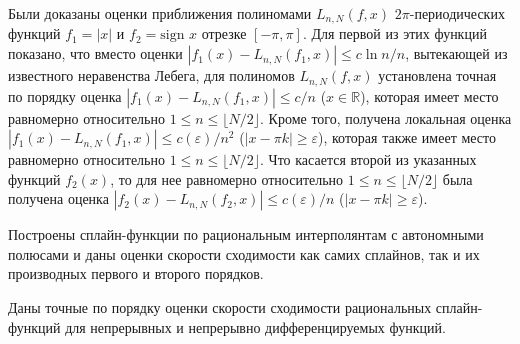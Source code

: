 Были доказаны оценки приближения полиномами $L_{n,N}(f,x)$ $2\pi$-периодических функций $f_1 = |x|$ и $f_2=\mbox{sign } x$ отрезке $[-\pi, \pi]$.
Для первой из этих функций показано, что вместо оценки $\left|f_{1}(x)-L_{n,N}(f_{1},x)\right| \leq c\ln n/n$,
вытекающей из известного неравенства Лебега, для полиномов $L_{n,N}(f,x)$ установлена точная по порядку оценка
$\left|f_{1}(x)-L_{n,N}(f_{1},x)\right| \leq c/n$ ($x \in \mathbb{R}$), которая имеет место равномерно относительно $1 \leq n \leq \lfloor N/2\rfloor$.
Кроме того, получена локальная оценка  $\left|f_{1}(x)-L_{n,N}(f_{1},x)\right| \leq c(\varepsilon)/n^2$ ($\left|x - \pi k\right| \geq \varepsilon$), которая также имеет место равномерно относительно $1 \leq n \leq \lfloor N/2\rfloor$.
Что касается второй из указанных функций $f_2(x)$, то для нее равномерно относительно $1 \leq n \leq \lfloor N/2\rfloor$ была получена оценка $\left|f_{2}(x)-L_{n,N}(f_{2},x)\right| \leq c(\varepsilon)/n$ ($\left|x - \pi k\right| \geq \varepsilon$).



Построены сплайн-функции по рациональным интерполянтам с автономными полюсами
и даны оценки скорости сходимости как самих сплайнов, так и их производных первого и
 второго порядков.	
 
Даны точные по порядку оценки скорости сходимости рациональных сплайн-функций
для непрерывных и непрерывно дифференцируемых функций.






















